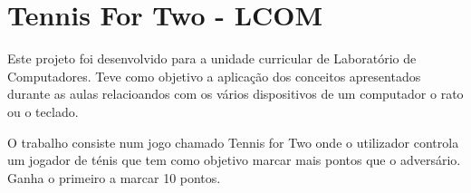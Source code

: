 \chapter{Tennis For Two -\/ LCOM}
\hypertarget{index}{}\label{index}
Este projeto foi desenvolvido para a unidade curricular de Laboratório de Computadores. Teve como objetivo a aplicação dos conceitos apresentados durante as aulas relacioandos com os vários dispositivos de um computador o rato ou o teclado.

O trabalho consiste num jogo chamado Tennis for Two onde o utilizador controla um jogador de ténis que tem como objetivo marcar mais pontos que o adversário. Ganha o primeiro a marcar 10 pontos. 